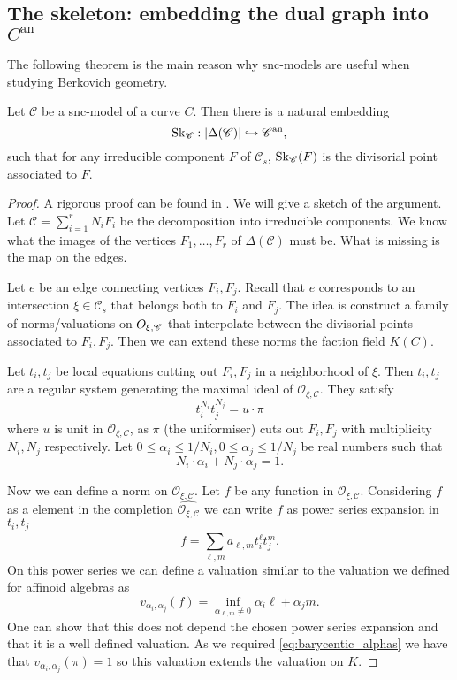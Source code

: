 \subsection{The skeleton: embedding the dual graph into $C^{\mathrm{an}}$}\label{sec:skeleton}
The following theorem is the main reason why snc-models are useful when studying Berkovich geometry. 
\begin{theorem}\label{thm:embedding_dual_graph}
	Let $\mathscr C$ be a snc-model of a curve $C$. 
	Then there is a natural embedding \[
		\operatorname{Sk}_{\mathscr C}:|\Delta(\mathscr C)| \hookrightarrow \mathscr C{}^{\text{an}}
	,\]
	such that for any irreducible component $F$ of $\mathscr C_s$,  $\operatorname{Sk}_{\mathscr C}(F)$ is the divisorial point associated to $F$. 
\end{theorem}
\begin{proof}
	A rigorous proof can be found in \cite[3.1.4]{mustataWeightFunctionsNonArchimedean2015}.
	We will give a sketch of the argument. 
	Let $\mathscr C = \sum_{i= 1}^{r} N_i F_i$ be the decomposition into irreducible components. 
	We know what the images of the vertices $F_1, \ldots, F_r$ of $\Delta(\mathscr C)$ must be.
	What is missing is the map on the edges. 

	Let $e$ be an edge connecting vertices $F_i, F_j$. 
	Recall that $e$ corresponds to an intersection $\xi \in \mathscr C_s$ that belongs both to $F_i$ and $F_j$. 
	The idea is construct a family of norms/valuations on $\mathscr \mathcal{O}_{\xi, \mathscr C}$ that interpolate between the divisorial points associated to $F_i, F_j$. Then we can extend these norms the faction field $K(C)$. 

	Let $t_i, t_j$ be local equations cutting out $F_i, F_j$ in a neighborhood of  $\xi$. 
	Then $t_i, t_j$ are a regular system generating the maximal ideal of $\mathcal{O}_{\xi, \mathscr C}. $ 
	They satisfy \[
		t_i ^{N_i} t _j^{N_j} = u\cdot \pi
	\] 
	where $u$ is unit in $\mathcal{O}_{\xi, \mathscr C}$, as $\pi$ (the uniformiser) cuts out $F_i, F_j$ with multiplicity $N_i, N_j$ respectively.  
	Let $0 \le \alpha_i \le 1 / N_i,   0 \le \alpha_j \le 1 / N_j$ be real numbers such that \begin{equation}\label{eq:barycentic_alphas}
		N_i\cdot \alpha_i + N_j \cdot \alpha_j = 1
	.\end{equation}
	
	Now we can define a norm on $\mathcal{O}_{\xi, \mathscr C}$. 
	Let  $f$ be any function in $\mathcal{O}_{\xi, \mathscr C}$. 
	Considering $f$ as a element in the completion $\hat{\mathcal{O}_{\xi, \mathscr C}}$ we can write $f$ as power series expansion in $t_i, t_j$  \[
		f = \sum_{\ell, m}^{} a_{\ell, m} t_i ^{\ell} t_j^{m}
	.\] 
	On this power series we can define a valuation similar to the valuation we defined  for affinoid algebras as \[
		v_{\alpha_i, \alpha_j}(f) = \inf_{\alpha_{\ell, m} \ne 0}{\alpha_i \ell + \alpha_j m}
	.\] 
	One can show that this does not depend the chosen power series expansion and that it is a well defined valuation. 
	As we required \eqref{eq:barycentic_alphas} we have that  $v_{\alpha_i, \alpha_j}(\pi) = 1$ so this valuation extends the valuation on $K$. 
\end{proof}
